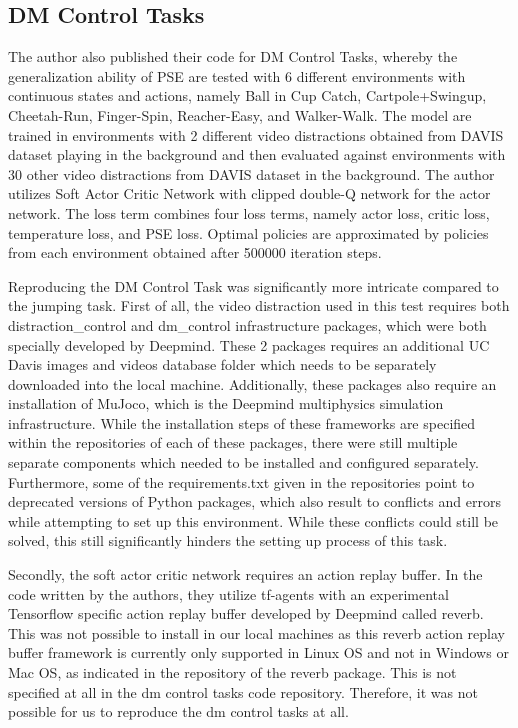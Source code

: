 \documentclass{usiinftr}
\begin{document}
\subsection{DM Control Tasks}
The author also published their code for DM Control Tasks, whereby the generalization ability of PSE are tested with 6 different environments with continuous states and actions, namely Ball in Cup Catch, Cartpole+Swingup, Cheetah-Run, Finger-Spin, Reacher-Easy, and Walker-Walk. The model are trained in environments with 2 different video distractions obtained from DAVIS dataset playing in the background and then evaluated against environments with 30 other video distractions from DAVIS dataset in the background. The author utilizes Soft Actor Critic Network with clipped double-Q network for the actor network. The loss term combines four loss terms, namely actor loss, critic loss, temperature loss, and PSE loss. Optimal policies are approximated by policies from each environment obtained after 500000 iteration steps. 

Reproducing the DM Control Task was significantly more intricate compared to the jumping task. First of all, the video distraction used in this test requires both distraction\_control and dm\_control infrastructure packages, which were both specially developed by Deepmind. These 2 packages requires an additional UC Davis images and videos database folder which needs to be separately downloaded into the local machine. Additionally, these packages also require an installation of MuJoco, which is the Deepmind multiphysics simulation infrastructure. While the installation steps of these frameworks are specified within the repositories of each of these packages, there were still multiple separate components which needed to be installed and configured separately. Furthermore, some of the requirements.txt given in the repositories point to deprecated versions of Python packages, which also result to conflicts and errors while attempting to set up this environment. While these conflicts could still be solved, this still significantly hinders the setting up process of this task. 

Secondly, the soft actor critic network requires an action replay buffer. In the code written by the authors, they utilize tf-agents with an experimental Tensorflow specific action replay buffer developed by Deepmind called reverb. This was not possible to install in our local machines as this reverb action replay buffer framework is currently only supported in Linux OS and not in Windows or Mac OS, as indicated in the repository of the reverb package. This is not specified at all in the dm control tasks code repository. Therefore, it was not possible for us to reproduce the dm control tasks at all.  
\end{document}
